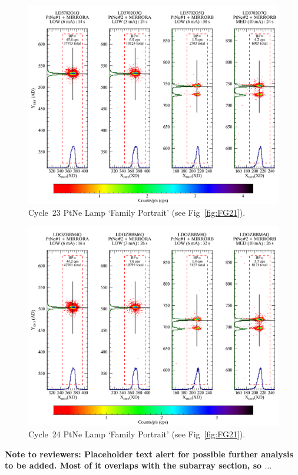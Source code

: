 \begin{figure}[htb]
\noindent\includegraphics*[width=0.75\linewidth]{png/C23_14440_FP.png}
\caption[C23 WCA Lamp `Family Portrait']{Cycle~23 PtNe Lamp `Family Portrait' (see Fig~\ref{fig:FG21}).\label{fig:FG23}}
\end{figure}
\begin{center}
	\begin{figure}[htb]
	\noindent\includegraphics*[width=0.75\linewidth]{png/C24_14857_FP.png}
	\caption[C24 WCA Lamp `Family Portrait']{Cycle~24 PtNe Lamp `Family Portrait' (see Fig~\ref{fig:FG21}).\label{fig:FG24}}
	\end{figure}
\end{center}

{\bf Note to reviewers: Placeholder text alert for possible further analysis to be added. Most of it overlaps with the subarray section, so $\dots$}
